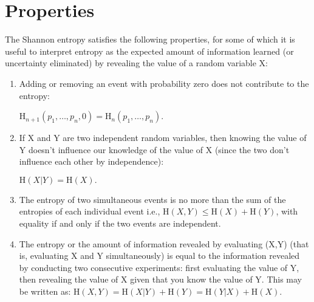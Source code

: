 \documentclass{article}
\begin{document}
\section{Properties}
The Shannon entropy satisfies the following properties, for some of which it is useful to interpret entropy as the expected amount of information learned (or uncertainty eliminated) by revealing the value of a random variable X:
\begin{enumerate}
    \item Adding or removing an event with probability zero does not contribute to the entropy: 
    
    $ \textrm{H} _{n+1}(p_{1},\ldots ,p_{n},0) = \textrm{H} _{n}(p_{1},\ldots ,p_{n}) $.
    
    \item If X and Y are two independent random variables, then knowing the value of Y doesn't influence our knowledge of the value of X (since the two don't influence each other by independence):
    
    $ \textrm{H} (X|Y) = \textrm {H} (X). $
    
    \item The entropy of two simultaneous events is no more than the sum of the entropies of each individual event i.e.,  $ \textrm{H} (X,Y) \leq \textrm{H} (X) + \textrm{H} (Y) $, with equality if and only if the two events are independent.
    
    \item The entropy or the amount of information revealed by evaluating (X,Y) (that is, evaluating X and Y simultaneously) is equal to the information revealed by conducting two consecutive experiments: first evaluating the value of Y, then revealing the value of X given that you know the value of Y. This may be written as:
    $ \mathrm {H} (X,Y)=\mathrm {H} (X|Y)+\mathrm {H} (Y)=\mathrm {H} (Y|X)+\mathrm {H} (X). $
\end{enumerate}
\end{document}
